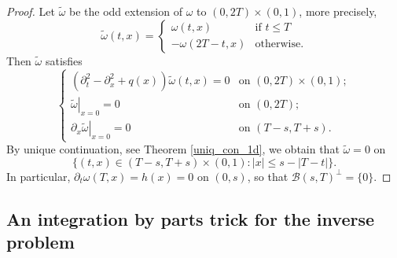 \documentclass[12pt,oneside,final]{amsart}
\begin{document}
\begin{proof}
	Let $\tilde{\omega}$ be the odd extension of $\omega$ to $(0, 2T)\times (0,1)$, more precisely,
	\begin{equation*}
		\tilde{\omega}(t,x)=
		\begin{cases}
			\omega(t,x) & \text{if } t\leq T\\
			-\omega (2T - t, x)  & \text{otherwise}.
		\end{cases}
	\end{equation*}
	Then $\tilde{\omega}$ satisfies
	\begin{equation*}
		\begin{cases}
			\left( \partial_t^2 - \partial_x^2 + q(x)\right)\tilde{\omega}(t,x) = 0 & \text{on } (0,2T)\times (0,1);\\
			\left.\tilde{\omega}\right|_{x=0} = 0 & \text{on } (0,2T);\\
			\left.\partial_x\tilde{\omega}\right|_{x=0} = 0 & \text{on } (T - s,T + s).
		\end{cases}
	\end{equation*}
	By unique continuation, see Theorem \ref{uniq_con_1d}, we obtain that $\tilde{\omega} = 0$ on 
	\begin{equation*}
		\{(t,x) \in (T - s, T + s)\times (0,1): |x| \leq s - |T - t|\}.
	\end{equation*}
	In particular, $\partial_t\omega(T,x) = h(x) = 0$ on $(0,s)$, so that $\mathcal{B}(s,T)^{\perp} = \{0\}$.
\end{proof}



\subsection{An integration by parts trick for the inverse problem}
\end{document}
